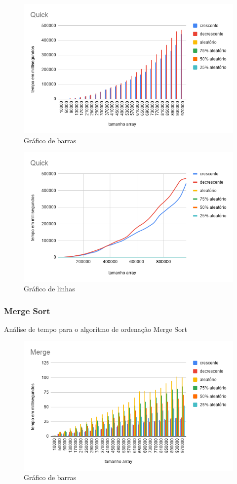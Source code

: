 \documentclass[a4paper, 12pt]{article}
\begin{document}
	\begin{figure}[!h]
		\caption{ Gráfico de barras }
		\label{fig:quick1}
		\centering
			\includegraphics[width=1\textwidth, height=0.60\textwidth]{Quick}
	\end{figure}
	\begin{figure}[!h]
		\caption{ Gráfico de linhas }
		\label{fig:quick2}
		\centering
			\includegraphics[width=1\textwidth, height=0.57\textwidth]{Quick_linha}
	\end{figure}
	\newpage

\subsubsection{Merge Sort}
Análise de tempo para o algoritmo de ordenação Merge Sort
	\begin{figure}[!h]
		\caption{ Gráfico de barras }
		\label{fig:merge1}
		\centering
			\includegraphics[width=1\textwidth, height=0.60\textwidth]{Merge}

	\end{figure}
\end{document}
